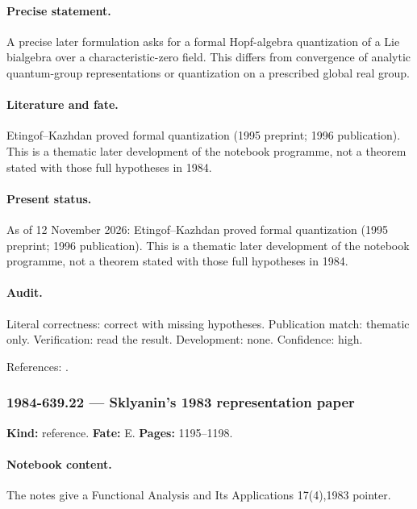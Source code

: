 \paragraph{Precise statement.} A precise later formulation asks for a formal Hopf-algebra quantization of a Lie bialgebra over a characteristic-zero field. This differs from convergence of analytic quantum-group representations or quantization on a prescribed global real group.

\paragraph{Literature and fate.} Etingof--Kazhdan proved formal quantization (1995 preprint; 1996 publication). This is a thematic later development of the notebook programme, not a theorem stated with those full hypotheses in 1984.

\paragraph{Present status.} As of 12 November 2026: Etingof--Kazhdan proved formal quantization (1995 preprint; 1996 publication). This is a thematic later development of the notebook programme, not a theorem stated with those full hypotheses in 1984.

\paragraph{Audit.} Literal correctness: correct with missing hypotheses. Publication match: thematic only. Verification: read the result. Development: none. Confidence: high.

\noindent References: \citep{etingofkazhdan1996quantization}.\par

\subsubsection{1984-639.22 --- Sklyanin's 1983 representation paper}

\label{item:1984-639.22}

\noindent\textbf{Kind:} reference. \textbf{Fate:} E. \textbf{Pages:} 1195--1198.\par

\paragraph{Notebook content.} The notes give a Functional Analysis and Its Applications 17(4),1983 pointer.

